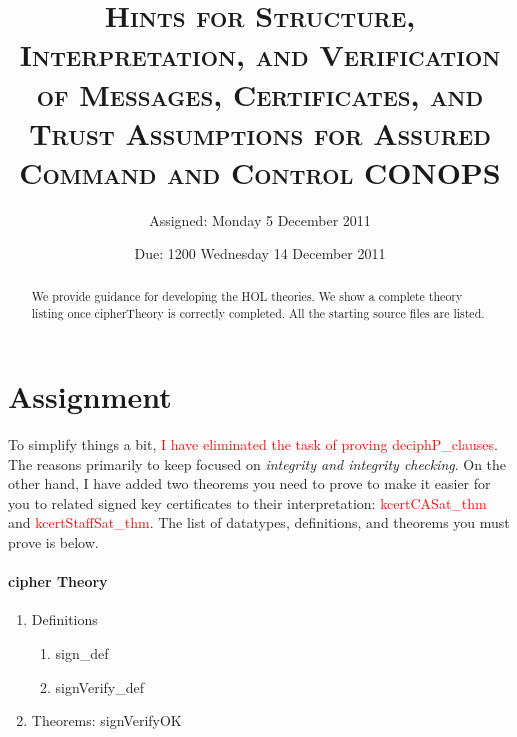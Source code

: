 \documentclass[10pt,twoside]{article}
\title{\textsc{Hints for Structure, Interpretation, and Verification of
    Messages, Certificates, and Trust Assumptions for Assured Command
    and Control CONOPS}}
\author{Assigned: Monday 5 December 2011}
\date{Due: 1200 Wednesday 14 December 2011}
\newcommand{\redtext}[1]{\textcolor{red}{#1}}
\begin{document}








\maketitle
\thispagestyle{empty}
\author{}
\maketitle

\begin{abstract}
  We provide guidance for developing the HOL theories. We show a
  complete theory listing once cipherTheory is correctly
  completed. All the starting source files are listed.
\end{abstract}

\section{Assignment}
\label{sec:assignment}

To simplify things a bit, \redtext{I have eliminated the task of
  proving deciphP\_clauses}. The reasons primarily to keep focused on
\emph{integrity and integrity checking}.  On the other hand, I have
added two theorems you need to prove to make it easier for you to
related signed key certificates to their interpretation:
\redtext{kcertCASat\_thm} and \redtext{kcertStaffSat\_thm}. The list
of datatypes, definitions, and theorems you must prove is below.

\paragraph{cipher Theory}

\begin{enumerate}
\item Definitions
  \begin{enumerate}[{a.}]
  \item sign\_def
  \item signVerify\_def
  \end{enumerate}
\item Theorems: signVerifyOK
\end{enumerate}
\end{document}
